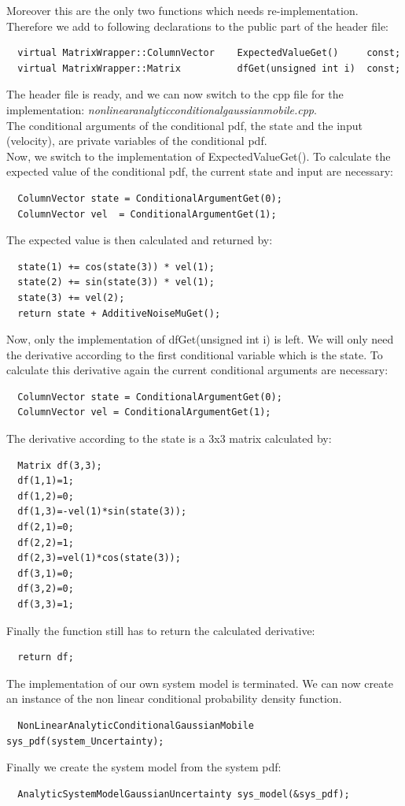 \documentclass[a4paper,10pt]{report}
\begin{document}
Moreover this are the only two functions which needs re-implementation.
Therefore we add to following declarations to the public part of the
header file:
\begin{verbatim}
  virtual MatrixWrapper::ColumnVector    ExpectedValueGet() 	const;
  virtual MatrixWrapper::Matrix          dfGet(unsigned int i)  const;
\end{verbatim}
The header file is ready, and we can now switch to the cpp file for
the implementation:
\emph{nonlinearanalyticconditionalgaussianmobile.cpp}.\\
The conditional arguments of the conditional pdf, the state and the
input (velocity), are private variables of the conditional pdf.\\
Now, we switch to the implementation of ExpectedValueGet().  To
calculate the expected value of the conditional pdf, the current state
and input are necessary:
\begin{verbatim}
  ColumnVector state = ConditionalArgumentGet(0);
  ColumnVector vel  = ConditionalArgumentGet(1);
\end{verbatim}
The expected value is then calculated and returned by:
\begin{verbatim}
  state(1) += cos(state(3)) * vel(1);
  state(2) += sin(state(3)) * vel(1);
  state(3) += vel(2);
  return state + AdditiveNoiseMuGet();
\end{verbatim}
Now, only the implementation of dfGet(unsigned int i) is left. We will
only need the derivative according to the first conditional variable
which is the state.  To calculate this derivative again the current
conditional arguments are necessary:
\begin{verbatim}
  ColumnVector state = ConditionalArgumentGet(0);
  ColumnVector vel = ConditionalArgumentGet(1);
\end{verbatim}
The derivative according to the state is a 3x3 matrix calculated by:
\begin{verbatim}
  Matrix df(3,3);
  df(1,1)=1;
  df(1,2)=0;
  df(1,3)=-vel(1)*sin(state(3));
  df(2,1)=0;
  df(2,2)=1;
  df(2,3)=vel(1)*cos(state(3));
  df(3,1)=0;
  df(3,2)=0;
  df(3,3)=1;
\end{verbatim}
Finally the function still has to return the calculated derivative:
\begin{verbatim}
  return df;
\end{verbatim}
The implementation of our own system model is terminated. We can now
create an instance of the non linear conditional probability density
function.
\begin{verbatim}
  NonLinearAnalyticConditionalGaussianMobile sys_pdf(system_Uncertainty);
\end{verbatim}
Finally we create the system model from the system pdf:
\begin{verbatim}
  AnalyticSystemModelGaussianUncertainty sys_model(&sys_pdf);
\end{verbatim}
\end{document}
